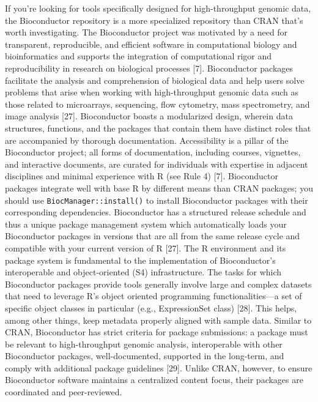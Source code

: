 \documentclass[10pt,letterpaper]{article}
\begin{document}
If you're looking for tools specifically designed for high-throughput
genomic data, the Bioconductor repository is a more specialized
repository than CRAN that's worth investigating. The Bioconductor
project was motivated by a need for transparent, reproducible, and
efficient software in computational biology and bioinformatics and
supports the integration of computational rigor and reproducibility in
research on biological processes {[}7{]}. Bioconductor packages
facilitate the analysis and comprehension of biological data and help
users solve problems that arise when working with high-throughput
genomic data such as those related to microarrays, sequencing, flow
cytometry, mass spectrometry, and image analysis {[}27{]}. Bioconductor
boasts a modularized design, wherein data structures, functions, and the
packages that contain them have distinct roles that are accompanied by
thorough documentation. Accessibility is a pillar of the Bioconductor
project; all forms of documentation, including courses, vignettes, and
interactive documents, are curated for individuals with expertise in
adjacent disciplines and minimal experience with R (see Rule 4) {[}7{]}.
Bioconductor packages integrate well with base R by different means than
CRAN packages; you should use \texttt{BiocManager::install()} to install
Bioconductor packages with their corresponding dependencies.
Bioconductor has a structured release schedule and thus a unique package
management system which automatically loads your Bioconductor packages
in versions that are all from the same release cycle and compatible with
your current version of R {[}27{]}. The R environment and its package
system is fundamental to the implementation of Bioconductor's
interoperable and object-oriented (S4) infrastructure. The tasks for
which Bioconductor packages provide tools generally involve large and
complex datasets that need to leverage R's object oriented programming
functionalities---a set of specific object classes in particular (e.g.,
ExpressionSet class) {[}28{]}. This helps, among other things, keep
metadata properly aligned with sample data. Similar to CRAN,
Bioconductor has strict criteria for package submissions: a package must
be relevant to high-throughput genomic analysis, interoperable with
other Bioconductor packages, well-documented, supported in the
long-term, and comply with additional package guidelines {[}29{]}.
Unlike CRAN, however, to ensure Bioconductor software maintains a
centralized content focus, their packages are coordinated and
peer-reviewed.
\end{document}
